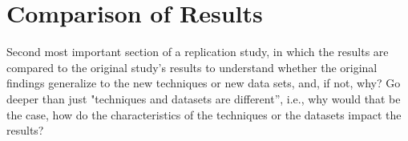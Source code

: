 

\section{Comparison of Results}
\label{sec:comparison-results}

Second most important section of a replication study, in which the results are compared to the original study's results to understand whether the original findings generalize to the new techniques or new data sets, and, if not, why? Go deeper than just "techniques and datasets are different'', i.e., why would that be the case, how do the characteristics of the techniques or the datasets impact the results?

